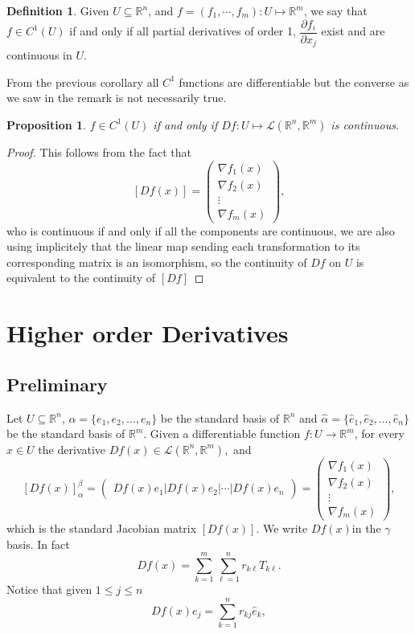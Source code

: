 \documentclass[11pt,openany]{book}
\theoremstyle{plain}
\newtheorem{proposition}{Proposition}[chapter]
\theoremstyle{definition}
\newtheorem{definition}{Definition}[chapter]
\theoremstyle{remark}
\newcommand{\R}{\mathbb{R}}
\begin{document}
\begin{definition}
Given $U\subseteq \mathbb R^n$, and $f=(f_1,\cdots,f_m):U\mapsto \mathbb R^m$, we say that $f\in C^1(U)$ if and only if all partial derivatives of order 1, $\dfrac{\partial f_i}{\partial x_j}$ exist and are continuous in $U$.
\end{definition}

From the previous corollary all $C^1$ functions are differentiable but the converse as we saw in the remark is not necessarily true.

\begin{proposition}
    $f\in C^1(U)$ if and only if $Df:U\mapsto \mathcal L(\mathbb R^n,\mathbb R^m)$ is continuous.
\end{proposition}

\begin{proof}
    This follows from the fact that 
    $$[Df(x)]=\begin{pmatrix}\nabla f_1(x)\\
    \nabla f_2(x)\\
    \vdots\\
    \nabla f_m(x)\end{pmatrix},$$
    who is continuous if and only if all the components are continuous, we are also using implicitely that the linear map sending each transformation to its corresponding matrix is an isomorphism, so the continuity of $Df$ on $U$ is equivalent to the continuity of $[Df]$
\end{proof}

\section{Higher order Derivatives}
\subsection{Preliminary}
Let $U \subseteq \R^n$, $\alpha = \{e_1, e_2, \dots, e_n\}$ be the standard basis of $\R^n$ and $\hat{\alpha} = \{\hat{e}_1, \hat{e}_2, \dots, \hat{e}_n\}$ be the standard basis of $\R^m$. Given a differentiable function $f:U \to \R^m$, for every $x\in U$ the derivative $Df(x)\in \mathcal L(\mathbb R^n,\mathbb R^m),$
and
$$[Df(x)]_{\alpha}^\beta=\begin{pmatrix} Df(x)e_1|Df(x)e_2|\cdots|Df(x)e_n\end{pmatrix}=\begin{pmatrix}\nabla f_1(x)\\ \nabla f_2(x)\\ \vdots \\ \nabla f_m(x)\end{pmatrix},$$
which is the standard Jacobian matrix $[Df(x)]$.
We write $Df(x)$in the $\gamma$ basis. In fact
$$
Df(x)=\sum_{k=1}^m\sum_{\ell=1}^n r_{k\ell}T_{k\ell}.
$$
Notice that given $1\leq j\leq n$
$$Df(x)e_j=\sum_{k=1}^n r_{kj}\hat{e}_k,$$
\end{document}

